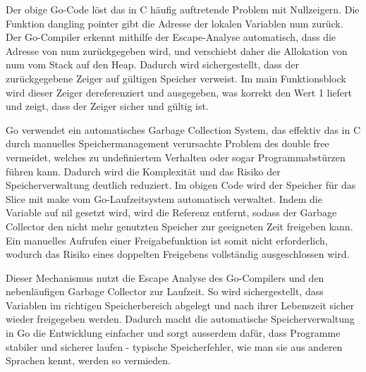 Der obige Go-Code löst das in C häufig auftretende Problem mit Nullzeigern. 
Die Funktion dangling pointer gibt die Adresse der lokalen Variablen num zurück. 
Der Go-Compiler erkennt mithilfe der Escape-Analyse automatisch, dass die 
Adresse von num zurückgegeben wird, und verschiebt daher die Allokation 
von num vom Stack auf den Heap. Dadurch wird sichergestellt, dass der 
zurückgegebene Zeiger auf gültigen Speicher verweist. Im main Funktionsblock 
wird dieser Zeiger dereferenziert und ausgegeben, was korrekt den Wert 1 liefert 
und zeigt, dass der Zeiger sicher und gültig ist.
\begin{figure}[htp]
    \centering
    
    \label{fig:double_free_in_Golang}
\end{figure}

Go verwendet ein automatisches Garbage Collection System, das effektiv 
das in C durch manuelles Speichermanagement verursachte Problem des 
double free vermeidet, welches zu undefiniertem Verhalten oder sogar 
Programmabstürzen führen kann. Dadurch wird die Komplexität und das 
Risiko der Speicherverwaltung deutlich reduziert\autocite{TheGolangMemoryModel}. Im obigen Code wird 
der Speicher für das Slice mit make vom Go-Laufzeitsystem automatisch 
verwaltet. Indem die Variable auf nil gesetzt wird, wird die Referenz 
entfernt, sodass der Garbage Collector den nicht mehr genutzten Speicher 
zur geeigneten Zeit freigeben kann. Ein manuelles Aufrufen einer 
Freigabefunktion ist somit nicht erforderlich, wodurch das Risiko 
eines doppelten Freigebens vollständig ausgeschlossen wird.

Dieser Mechanismus nutzt die Escape Analyse des Go-Compilers und den nebenläufigen 
Garbage Collector zur Laufzeit. So wird sichergestellt, dass Variablen im richtigen 
Speicherbereich abgelegt und nach ihrer Lebenszeit sicher wieder freigegeben werden\autocite{TheGolangMemoryModel}. 
Dadurch macht die automatische Speicherverwaltung in Go die Entwicklung einfacher und sorgt ausserdem dafür, 
dass Programme stabiler und sicherer laufen - typische Speicherfehler, wie man sie aus anderen Sprachen kennt, 
werden so vermieden.

